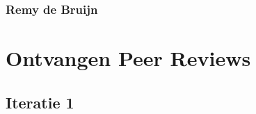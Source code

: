 \documentclass[a4paper]{report}
\begin{document}
\subsubsection{Remy de Bruijn}
\noindent
\begin{minipage}{\textwidth}
  \centering
\end{minipage}

\clearpage

\section{Ontvangen Peer Reviews}
\subsection{Iteratie 1}
\end{document}
